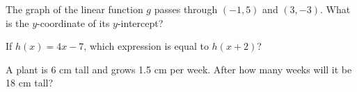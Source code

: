 \begin{exo}{\sprtag}
The graph of the linear function $g$ passes through $(-1,5)$ and $(3,-3)$. What is the $y$-coordinate of its $y$-intercept?
\end{exo}
\begin{exo}{}
If $h(x)=4x-7$, which expression is equal to $h(x+2)$?
\end{exo}
\begin{exo}{\sprtag}
A plant is 6 cm tall and grows 1.5 cm per week. After how many weeks will it be 18 cm tall?
\end{exo}

